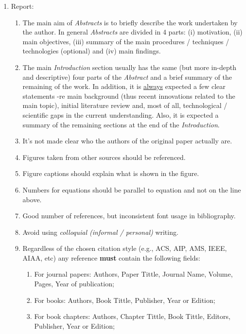 \documentclass[14pt,twoside]{report}
\begin{document}
\begin{enumerate}

\item Report:
\begin{enumerate}
%
\item The main aim of {\it Abstracts} is to briefly describe the work undertaken by the author. In general {\it Abstracts} are divided in 4 parts: (i) motivation, (ii) main objectives, (iii) summary of the main procedures / techniques / technologies (optional) and (iv) main findings. 
%
\item The main {\it Introduction} section usually has the same (but more in-depth and descriptive) four parts of the {\it Abstract} and a brief summary of the remaining of the work. In addition, it is \underline{always} expected a few clear statements -re main background (thus recent innovations related to the main topic), initial literature review and, most of all, technological / scientific gaps in the current understanding. Also, it is expected a summary of the remaining sections at the end of the {\it Introduction}.
%
\item It's not made clear who the authors of the original paper actually are.
%
\item Figures taken from other sources should be referenced.
%
\item Figure captions should explain what is shown in the figure.
%
\item Numbers for equations should be parallel to equation and not on the line above.
%
\item Good number of references, but inconsistent font usage in bibliography.
%
\item Avoid using {\it colloquial (informal / personal)} writing.
%
\item Regardless of the chosen citation style (e.g., ACS, AIP, AMS, IEEE, AIAA, etc) any reference {\bf must} contain the following fields: 
\begin{enumerate}
\item For journal papers: Authors, Paper Tittle, Journal Name, Volume, Pages, Year of publication;
\item For books: Authors, Book Tittle, Publisher, Year or Edition;
\item For book chapters: Authors, Chapter Tittle, Book Tittle, Editors, Publisher, Year or Edition;

\end{enumerate}
\end{enumerate}
\end{enumerate}
\end{document}
